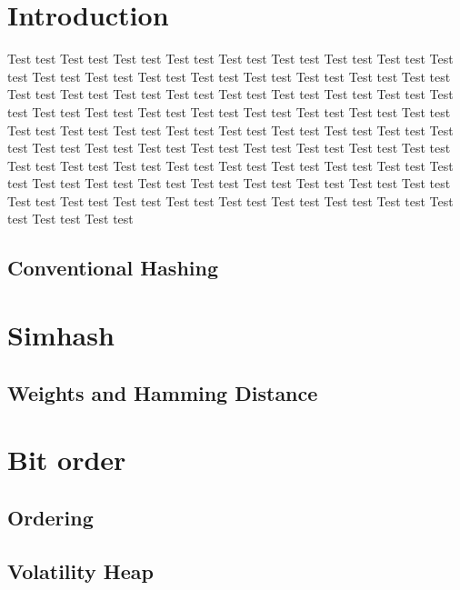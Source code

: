 \documentclass[12pt,a4paper]{scrartcl}
\begin{document}
\title{}
\author{Arne Beer, MN 6489196, University of Hamburg}
\date{20.08.2019}

\maketitle


\section{Introduction}

Test test Test test Test test Test test Test test Test test Test test Test test Test test Test test Test test Test test Test test Test test Test test Test test Test test Test test Test test Test test Test test Test test Test test Test test Test test Test test Test test Test test Test test Test test Test test Test test Test test Test test Test test Test test Test test Test test Test test Test test Test test Test test Test test Test test Test test Test test Test test Test test Test test Test test Test test Test test Test test Test test Test test Test test Test test Test test Test test Test test Test test Test test Test test Test test Test test Test test Test test Test test Test test Test test Test test Test test Test test Test test Test test Test test Test test Test test Test test

\subsection{Conventional Hashing}

\section{Simhash}

\subsection{Weights and Hamming Distance}

\section{Bit order}

\subsection{Ordering}

\subsection{Volatility Heap}
\end{document}
